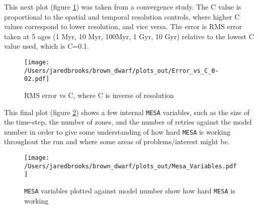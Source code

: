 \documentclass{article}
\begin{document}
        This next plot (figure \ref{fig:7}) was taken from a convergence study.  The C value is proportional to the spatial and temporal resolution controls, where higher C values correspond to lower resolution, and vice versa.  The error is RMS error taken at 5 ages (1 Myr, 10 Myr, 100Myr, 1 Gyr, 10 Gyr) relative to the lowest C value used, which is C=0.1.

        \begin{figure}[H]
                \centering
                \texttt{[image: /Users/jaredbrooks/brown\_dwarf/plots\_out/Error\_vs\_C\_0-02.pdf]}
                \caption{RMS error vs C, where C is inverse of resolution}
                \label{fig:7}
        \end{figure}

        \pagebreak

        This final plot (figure \ref{fig:6}) shows a few internal \texttt{MESA} variables, such as the size of the time-step, the number of zones, and the number of retries against the model number in order to give some understanding of how hard \texttt{MESA} is working throughout the run and where some areas of problems/interest might be.

        \begin{figure}[H]
                \centering
                \texttt{[image: /Users/jaredbrooks/brown\_dwarf/plots\_out/Mesa\_Variables.pdf]}
                \caption{\texttt{MESA} variables plotted against model number show how hard \texttt{MESA} is working}
                \label{fig:6}
        \end{figure}
\end{document}
